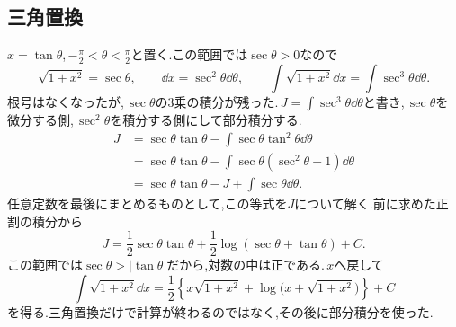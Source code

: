 \subsection{三角置換}

$x=\tan\theta$,\,$-\frac\pi2<\theta<\frac\pi2$と置く.この範囲では$\sec\theta>0$なので
\[
\sqrt{1+x^2}=\sec\theta,\qquad
\dd x=\sec^2\theta\dd\theta,\qquad
\int\sqrt{1+x^2}\dd x=\int\sec^3\theta\dd\theta.
\]
根号はなくなったが,\,$\sec\theta$の3乗の積分が残った.\,$J=\int\sec^3\theta\dd\theta$と書き,\,$\sec\theta$を微分する側,\,$\sec^2\theta$を積分する側にして部分積分する.
\[
\begin{aligned}
J&=\sec\theta\tan\theta
-\int\sec\theta\tan^2\theta\dd\theta\\
&=\sec\theta\tan\theta
-\int\sec\theta(\sec^2\theta-1)\dd\theta\\
&=\sec\theta\tan\theta-J+\int\sec\theta\dd\theta.
\end{aligned}
\]
任意定数を最後にまとめるものとして,この等式を$J$について解く.前に求めた正割の積分から
\[
J=\frac12\sec\theta\tan\theta
+\frac12\log(\sec\theta+\tan\theta)+C.
\]
この範囲では$\sec\theta>|\tan\theta|$だから,対数の中は正である.\,$x$へ戻して
\begin{equation}\label{式:一と二乗の根号積分}
\int\sqrt{1+x^2}\dd x
=\frac12\left\{x\sqrt{1+x^2}
+\log\bigl(x+\sqrt{1+x^2}\bigr)\right\}+C
\end{equation}
を得る.三角置換だけで計算が終わるのではなく,その後に部分積分を使った.


